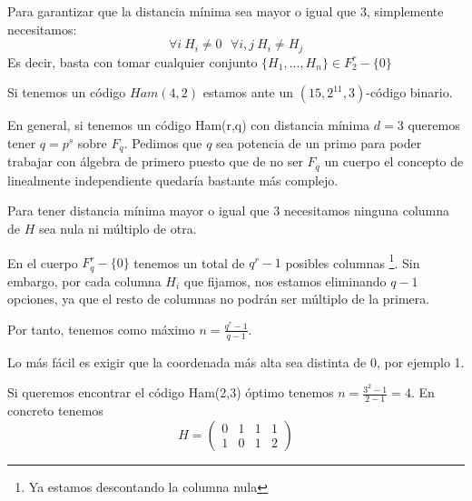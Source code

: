 Para garantizar que la distancia mínima sea mayor o igual que 3, simplemente necesitamos:
\[\forall i \ H_i \neq 0 \ \ \ \forall i,j \ H_i \neq H_j\]
Es decir, basta con tomar cualquier conjunto $\{H_1,...,H_n\}\in F_2^r-\{0\}$

Si tenemos un código $Ham(4,2)$ estamos ante un $(15,2^{11},3)$-código binario.

En general, si tenemos un código Ham(r,q) con distancia mínima $d=3$ queremos tener $q=p^s$ sobre $F_q$. Pedimos que $q$ sea potencia de un primo para poder trabajar con álgebra de primero puesto que de no ser $F_q$ un cuerpo el concepto de linealmente independiente quedaría bastante más complejo.

Para tener distancia mínima mayor o igual que $3$ necesitamos ninguna columna de $H$ sea nula ni múltiplo de otra.

En el cuerpo $F_q^r-\{0\}$ tenemos un total de $q^r-1$ posibles columnas \footnote{Ya estamos descontando la columna nula}. Sin embargo, por cada columna $H_i$ que fijamos, nos estamos eliminando $q-1$ opciones, ya que el resto de columnas no podrán ser múltiplo de la primera.

Por tanto, tenemos como máximo $n=\frac{q^r-1}{q-1}$.

Lo más fácil es exigir que la coordenada más alta sea distinta de 0, por ejemplo 1.

\begin{example}
Si queremos encontrar el código Ham(2,3) óptimo tenemos $n=\frac{3^2-1}{2-1}=4$. En concreto tenemos
\[H=\left( \begin{array}{cccc}
0 & 1 & 1 & 1 \\
1 & 0 & 1 & 2
\end{array}\right)\]
\end{example}